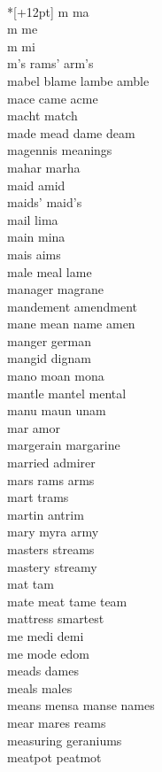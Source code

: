 \vspace{14pt}
\noindent\notextbf{\LargeM}\\*[+12pt]
m ma \\
m me \\
m mi \\
m's rams' arm's  \\
mabel blame lambe amble\\
mace came acme\\
macht match\\
made mead dame deam\\
magennis meanings\\
mahar marha\\
maid amid\\
maids' maid's\\
mail lima\\
main mina\\
mais aims\\
male meal lame\\
manager magrane\\
mandement amendment\\
mane mean name amen\\
manger german\\
mangid dignam\\
mano moan mona\\
mantle mantel mental\\
manu maun unam\\
mar amor \\
margerain margarine\\
married admirer\\
mars rams arms\\
mart trams \\
martin antrim\\
mary myra army\\
masters streams\\
mastery streamy\\
mat tam\\
mate meat tame team\\
mattress smartest\\
me medi demi  \\
me mode edom  \\
meads dames\\
meals males\\
means mensa manse names\\
mear mares reams \\
measuring geraniums\\
meatpot peatmot\\
